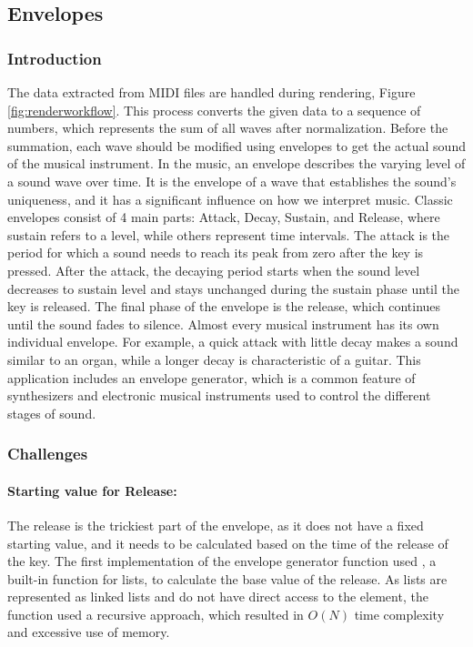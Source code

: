\documentclass[runningheads]{llncs}
\begin{document}
\subsection{Envelopes} \label{sec:envelope}

\subsubsection{Introduction}
The data extracted from MIDI files are handled during rendering, Figure  \ref{fig:renderworkflow}. This process converts the given data to a sequence of numbers, which represents the sum of all waves after normalization. Before the summation, each wave should be modified using envelopes to get the actual sound of the musical instrument. In the music, an envelope describes the varying level of a sound wave over time. It is the envelope of a wave that establishes the sound’s uniqueness, and it has a significant influence on how we interpret music. Classic envelopes consist of 4 main parts: Attack\label{sec:envelopeStepsAttack}, Decay\label{sec:envelopeStepsDecay}, Sustain\label{sec:envelopeStepsSustain}, and Release\label{sec:envelopeStepsRelease}, where sustain refers to a level, while others represent time intervals. The attack is the period for which a sound needs to reach its peak from zero after the key is pressed. After the attack, the decaying period starts when the sound level decreases to sustain level and stays unchanged during the sustain phase until the key is released. The final phase of the envelope is the release, which continues until the sound fades to silence. Almost every musical instrument has its own individual envelope. For example, a quick attack with little decay makes a sound similar to an organ, while a longer decay is characteristic of a guitar. This application includes an envelope generator, which is a common feature of synthesizers and electronic musical instruments used to control the different stages of sound.

\subsubsection{Challenges}

\paragraph{\textbf{Starting value for Release:}} The release is the trickiest part of the envelope, as it does not have a fixed starting value, and it needs to be calculated based on the time of the release of the key. The first implementation of the envelope generator function used , a built-in function for lists, to calculate the base value of the release. As lists are represented as linked lists and do not have direct access to the element, the  function used a recursive approach, which resulted in \(O(N)\) time complexity and excessive use of memory.
\end{document}
